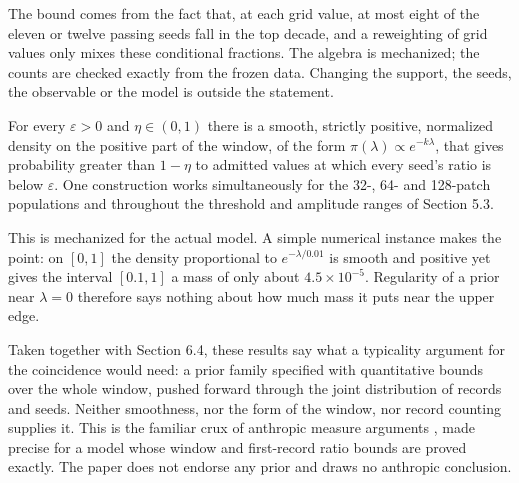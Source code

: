 The bound comes from the fact that, at each grid value, at most eight of
the eleven or twelve passing seeds fall in the top decade, and a
reweighting of grid values only mixes these conditional fractions. The
algebra is mechanized; the counts are checked exactly from the frozen
data. Changing the support, the seeds, the observable or the model is
outside the statement.

\begin{proposition}\label{prop:smoothprior}
For every $\varepsilon>0$ and $\eta\in(0,1)$ there is a smooth, strictly positive, normalized density on the positive part
of the window, of the form $\pi(\lambda)\propto e^{-k\lambda}$, that gives probability greater than $1-\eta$ to admitted
values at which every seed's ratio is below $\varepsilon$. One construction works simultaneously for the 32-, 64- and
128-patch populations and throughout the threshold and amplitude ranges of Section 5.3.
\end{proposition}

This is mechanized for the actual model. A simple numerical instance
makes the point: on \([0,1]\) the density proportional to
\(e^{-\lambda/0.01}\) is smooth and positive yet gives the interval
\([0.1,1]\) a mass of only about \(4.5\times10^{-5}\). Regularity of a
prior near \(\lambda=0\) therefore says nothing about how much mass it
puts near the upper edge.

Taken together with Section 6.4, these results say what a typicality
argument for the coincidence would need: a prior family specified with
quantitative bounds over the whole window, pushed forward through the
joint distribution of records and seeds. Neither smoothness, nor the
form of the window, nor record counting supplies it. This is the
familiar crux of anthropic measure arguments
\citep{BoussoPolchinski2000}, made precise for a model whose window and
first-record ratio bounds are proved exactly. The paper does not endorse
any prior and draws no anthropic conclusion.
